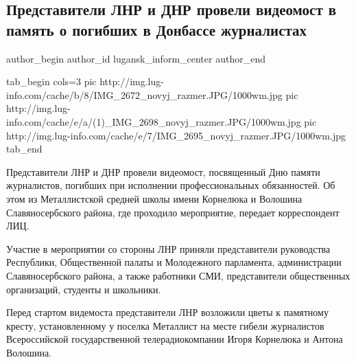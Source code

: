  
 
 
 
 
 
\subsection{Представители ЛНР и ДНР провели видеомост в память о погибших в Донбассе журналистах}
\label{sec:14_12_2020.news.lnr.lug_info.lugansk_inform_center.1.pamjat_zhurnalists}
\ifcmt
	author_begin
   author_id lugansk_inform_center
	author_end
\fi

\ifcmt
tab_begin cols=3
	pic http://img.lug-info.com/cache/b/8/IMG_2672_novyj_razmer.JPG/1000wm.jpg
	pic http://img.lug-info.com/cache/e/a/(1)_IMG_2698_novyj_razmer.JPG/1000wm.jpg
	pic http://img.lug-info.com/cache/e/7/IMG_2695_novyj_razmer.JPG/1000wm.jpg
tab_end
\fi


Представители ЛНР и ДНР провели видеомост, посвященный Дню памяти журналистов,
погибших при исполнении профессиональных обязанностей. Об этом из Металлистской
средней школы имени Корнелюка и Волошина Славяносербского района, где проходило
мероприятие, передает корреспондент ЛИЦ.

Участие в мероприятии со стороны ЛНР приняли представители руководства
Республики, Общественной палаты и Молодежного парламента, администрации
Славяносербского района, а также работники СМИ, представители общественных
организаций, студенты и школьники.

Перед стартом видемоста представители ЛНР возложили цветы к памятному кресту,
установленному у поселка Металлист на месте гибели журналистов Всероссийской
государственной телерадиокомпании Игоря Корнелюка и Антона Волошина. 

